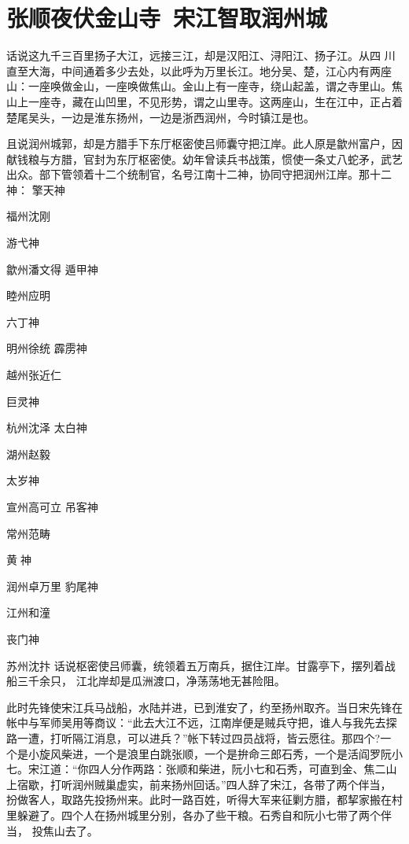 \chapter{张顺夜伏金山寺~宋江智取润州城}

话说这九千三百里扬子大江，远接三江，却是汉阳江、浔阳江、扬子江。从四
川直至大海，中间通着多少去处，以此呼为万里长江。地分吴、楚，江心内有两座
山：一座唤做金山，一座唤做焦山。金山上有一座寺，绕山起盖，谓之寺里山。焦
山上一座寺，藏在山凹里，不见形势，谓之山里寺。这两座山，生在江中，正占着
楚尾吴头，一边是淮东扬州，一边是浙西润州，今时镇江是也。

且说润州城郭，却是方腊手下东厅枢密使吕师囊守把江岸。此人原是歙州富户，因
献钱粮与方腊，官封为东厅枢密使。幼年曾读兵书战策，惯使一条丈八蛇矛，武艺
出众。部下管领着十二个统制官，名号江南十二神，协同守把润州江岸。那十二神：
擎天神

福州沈刚

游弋神

歙州潘文得
遁甲神

睦州应明

六丁神

明州徐统
霹雳神

越州张近仁

巨灵神

杭州沈泽
太白神

湖州赵毅

太岁神

宣州高可立
吊客神

常州范畴

黄神

润州卓万里
豹尾神

江州和潼

丧门神

苏州沈抃
话说枢密使吕师囊，统领着五万南兵，据住江岸。甘露亭下，摆列着战船三千余只，
江北岸却是瓜洲渡口，净荡荡地无甚险阻。

此时先锋使宋江兵马战船，水陆并进，已到淮安了，约至扬州取齐。当日宋先锋在
帐中与军师吴用等商议：“此去大江不远，江南岸便是贼兵守把，谁人与我先去探
路一遭，打听隔江消息，可以进兵？”帐下转过四员战将，皆云愿往。那四个?一
个是小旋风柴进，一个是浪里白跳张顺，一个是拚命三郎石秀，一个是活阎罗阮小
七。宋江道：“你四人分作两路：张顺和柴进，阮小七和石秀，可直到金、焦二山
上宿歇，打听润州贼巢虚实，前来扬州回话。”四人辞了宋江，各带了两个伴当，
扮做客人，取路先投扬州来。此时一路百姓，听得大军来征剿方腊，都挈家搬在村
里躲避了。四个人在扬州城里分别，各办了些干粮。石秀自和阮小七带了两个伴当，
投焦山去了。

